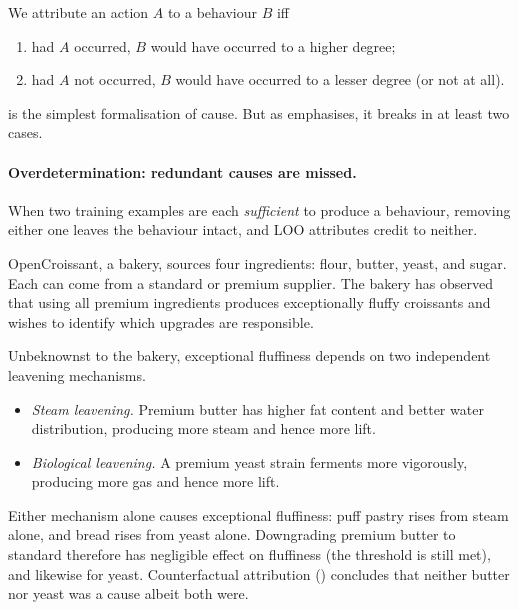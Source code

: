 \begin{definition}\label{def:counterfactual}
  We attribute an action $A$ to a behaviour $B$ iff
  \begin{enumerate}[label=(\roman*)]
    \item had $A$ occurred, $B$ would have occurred to a higher degree;
    \item had $A$ not occurred, $B$ would have occurred to a lesser degree (or not at all).
  \end{enumerate}
\end{definition}

 is the simplest formalisation of cause. But as \citet{mueller} emphasises, it breaks in at least two cases.

\paragraph{Overdetermination: redundant causes are missed.} When two training examples are each \emph{sufficient} to produce a behaviour, removing either one leaves the behaviour intact, and LOO attributes credit to neither.

\begin{example}\label{ex:croissant}
  OpenCroissant, a bakery, sources four ingredients: flour, butter, yeast, and sugar. Each can come from a standard or premium supplier. The bakery has observed that using all premium ingredients produces exceptionally fluffy croissants and wishes to identify which upgrades are responsible.

  Unbeknownst to the bakery, exceptional fluffiness depends on two independent leavening mechanisms.
  \begin{itemize}
    \item \emph{Steam leavening.} Premium butter has higher fat content and better water distribution, producing more steam and hence more lift.
    \item \emph{Biological leavening.} A premium yeast strain ferments more vigorously, producing more gas and hence more lift.
  \end{itemize}
  Either mechanism alone causes exceptional fluffiness: puff pastry rises from steam alone, and bread rises from yeast alone. Downgrading premium butter to standard therefore has negligible effect on fluffiness (the threshold is still met), and likewise for yeast. Counterfactual attribution () concludes that neither butter nor yeast was a cause albeit both were.
\end{example}

